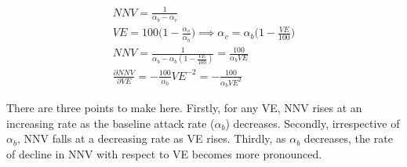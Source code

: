 \documentclass[12pt]{article}
\begin{document}
\begin{eqnarray}
	{NNV} = \frac{1}{\alpha_{b} - \alpha_{v}} \\
	{VE} = 100 \big(1 - \frac{\alpha_{v}}{\alpha_{b}} \big) \implies \alpha_{v} = \alpha_{b} \big(1 - \frac{VE}{100} \big) \\ 
	{NNV} = \frac{1}{\alpha_{b} - \alpha_{b} (1 - \frac{VE}{100})} = \frac{100}{\alpha_{b} VE} \\ 
	\frac{\partial {NNV}}{\partial{VE}} = - \frac{100}{\alpha_{b}}{VE}^{-2} = - \frac{100}{\alpha_{b} {VE}^{2}}
\end{eqnarray}

There are three points to make here. Firstly, for any VE, NNV rises at an increasing rate as the baseline attack rate ($\alpha_{b}$) decreases. Secondly, irrespective of $\alpha_{b}$, NNV falls at a decreasing rate as VE rises. Thirdly, as $\alpha_{b}$ decreases, the rate of decline in NNV with respect to VE becomes more pronounced. 
\end{document}
